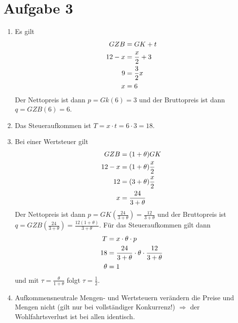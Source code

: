 \documentclass{article}
\begin{document}
	\section*{Aufgabe 3}
	\begin{enumerate}[label=(\alph*)]
		\item Es gilt
		\begin{align}
			GZB &= GK+t \notag \\
			12-x &= \frac{x}{2} + 3 \notag \\
			9 &= \frac{3}{2}x \notag \\
			x &= 6 \notag
		\end{align}
		Der Nettopreis ist dann $p=Gk(6)=3$ und der Bruttopreis ist dann $q=GZB(6)=6$.
		\item Das Steueraufkommen ist $T=x\cdot t = 6\cdot 3=18$.
		\item Bei einer Wertsteuer gilt
		\begin{align}
			GZB &= (1+\theta)GK \notag \\
			12-x &= (1+\theta)\frac{x}{2} \notag \\
			12 &= (3+\theta)\frac{x}{2} \notag \\
			x &= \frac{24}{3+\theta} \notag
		\end{align}
		Der Nettopreis ist dann $p=GK\left(\frac{24}{3+\theta}\right)=\frac{12}{3+\theta}$ und der Bruttopreis ist $q=GZB\left(\frac{24}{3+\theta}\right)=\frac{12(1+\theta)}{3+\theta}$. Für das Steueraufkommen gilt dann
		\begin{align}
			T &= x\cdot \theta \cdot p \notag \\
			18 &= \frac{24}{3+\theta}\cdot\theta\cdot\frac{12}{3+\theta} \notag \\
			\theta &= 1 \notag
		\end{align}
		und mit $\tau=\frac{\theta}{1+\theta}$ folgt $\tau=\frac{1}{2}$.
		\item Aufkommensneutrale Mengen- und Wertsteuern verändern die Preise und Mengen nicht (gilt nur bei vollständiger Konkurrenz!) $\Rightarrow$ der Wohlfahrtsverlust ist bei allen identisch.
	\end{enumerate}
\end{document}
